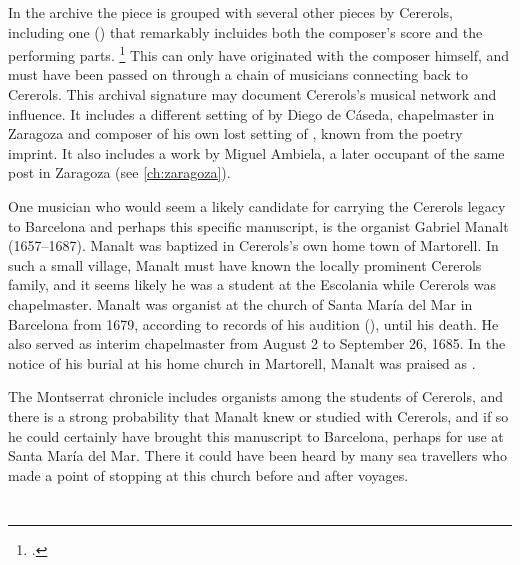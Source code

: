 In the archive the piece is grouped with several other pieces by Cererols,
including one () that remarkably incluides
both the composer's score and the performing parts.%
    \footnote{.}
This can only have originated with the composer himself, and must have been
passed on through a chain of musicians connecting back to Cererols.
This archival signature may document Cererols's musical network and influence.
It includes a different setting of  by Diego
de Cáseda, chapelmaster in Zaragoza and composer of his own lost setting of
, known from the poetry imprint.
It also includes a work by Miguel Ambiela, a later occupant of the same post in
Zaragoza (see \cref{ch:zaragoza}).

One musician who would seem a likely candidate for carrying the Cererols legacy
to Barcelona and perhaps this specific manuscript, is the organist Gabriel
Manalt (1657--1687).
Manalt was baptized in Cererols's own home town of Martorell.
In such a small village, Manalt must have known the locally prominent Cererols
family, and it seems likely he was a student at the Escolania while Cererols was
chapelmaster.
Manalt was organist at the church of Santa María del Mar in Barcelona from 1679,
according to records of his audition (), until his death.
He also served as interim chapelmaster from August 2 to September 26, 1685.%
    \Autocite[70--71]{Balanza:CererolsFamily}
In the notice of his burial at his home church in Martorell, Manalt was praised
as .%
The Montserrat chronicle includes organists among the students of Cererols, and
there is a strong probability that Manalt knew or studied with Cererols, and if
so he could certainly have brought this manuscript to Barcelona, perhaps for use
at Santa María del Mar.
There it could have been heard by many sea travellers who made a point of
stopping at this church before and after voyages.\XXX[really?]








\section{}



\endinput
